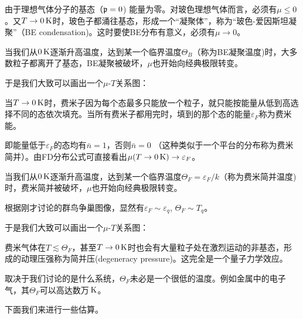 \documentclass[CJK]{beamer}
\begin{document}
\begin{frame}
\bch
{}
{\small
由于理想气体分子的基态（${\mathfrak{p}} = 0$) 能量为零。对玻色理想气体而言，必须有$\mu \le 0$。又$T \rightarrow 0\,\mathrm{K}$时，玻色子都涌往基态，形成一个“凝聚体”，称为“{\blue 玻色-爱因斯坦凝聚}”（BE condensation)。这时要使BE分布有意义，必须有$\mu \rightarrow 0$。

当我们从$0\,\mathrm{K}$逐渐升高温度，达到某一个临界温度$\Theta_B$（称为{\blue BE凝聚温度})时，大多数粒子都离开了基态，BE凝聚被破坏，$\mu$也开始向经典极限转变。

于是我们大致可以画出一个$\mu$-$T$关系图：}
\emini
{}
\emini

\ech
\end{frame}


\begin{frame}
\bch
{}
{\small
当$T \rightarrow 0\,\mathrm{K}$时，费米子因为每个态最多只能放一个粒子，就只能按能量从低到高选择不同的态依次填充。当所有费米子都用完时，填到的那个态的能量$\varepsilon_F$称为{\blue 费米能}。

即能量低于$\varepsilon_F$的态均有$\bar{n} = 1$，否则$\bar{n} = 0$ （这种类似于一个平台的分布称为费米简并）。由FD分布公式可直接看出$\mu(T\rightarrow 0\,\mathrm{K}) \rightarrow \varepsilon_F$。


当我们从$0\,\mathrm{K}$逐渐升高温度，达到某一个临界温度$\Theta_F = \varepsilon_F/k $（称为{\blue 费米简并温度})时，费米简并被破坏，$\mu$也开始向经典极限转变。

根据刚才讨论的群鸟争巢图像，显然有$\varepsilon_F \sim \varepsilon_q$,  $\Theta_F \sim T_q$。

于是我们大致可以画出一个$\mu$-$T$关系图：}
\emini
{}
\emini

\ech
\end{frame}


\begin{frame}
\bch


费米气体在$T\lesssim \Theta_F$，甚至$T\rightarrow 0\,\mathrm{K}$时也会有大量粒子处在激烈运动的非基态，形成的动理压强称为{\blue 简并压}(degeneracy pressure)。这完全是一个量子力学效应。

\skipline

取决于我们讨论的是什么系统，$\Theta_F$未必是一个很低的温度。例如金属中的电子气，其$\Theta_F$可以高达数万$\,\mathrm{K}$。

下面我们来进行一些估算。
\ech
\end{frame}
\end{document}
